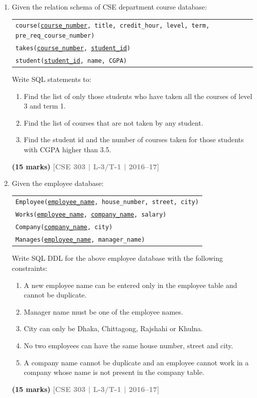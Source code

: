 \documentclass[12pt]{article}
\newcommand{\yr}[1]{\hfill\textcolor{gray}{\small\textbf{[#1]}}}
\newcommand{\mk}[1]{\textcolor{orange!70!black}{\small\textbf{(#1 marks)}}}
\begin{document}
\begin{enumerate}
\item Given the relation schema of CSE department course database:
\begin{center}
\begin{tabular}{l}
\texttt{course(\underline{course\_number}, title, credit\_hour, level, term, pre\_req\_course\_number)}\\
\texttt{takes(\underline{course\_number}, \underline{student\_id})}\\
\texttt{student(\underline{student\_id}, name, CGPA)}
\end{tabular}
\end{center}
Write SQL statements to:
\begin{enumerate}
  \item Find the list of only those students who have taken all the courses of level 3 and term 1.
  \item Find the list of courses that are not taken by any student.
  \item Find the student id and the number of courses taken for those students with CGPA higher than 3.5.
\end{enumerate}
\mk{15} \yr{CSE 303 | L-3/T-1 | 2016--17}


\item Given the employee database:
\begin{center}
\begin{tabular}{l}
\texttt{Employee(\underline{employee\_name}, house\_number, street, city)}\\
\texttt{Works(\underline{employee\_name}, \underline{company\_name}, salary)}\\
\texttt{Company(\underline{company\_name}, city)}\\
\texttt{Manages(\underline{employee\_name}, manager\_name)}
\end{tabular}
\end{center}
Write SQL DDL for the above employee database with the following constraints:
\begin{enumerate}
  \item A new employee name can be entered only in the employee table and cannot be duplicate.
  \item Manager name must be one of the employee names.
  \item City can only be Dhaka, Chittagong, Rajshahi or Khulna.
  \item No two employees can have the same house number, street and city.
  \item A company name cannot be duplicate and an employee cannot work in a company whose name is not present in the company table.
\end{enumerate}
\mk{15} \yr{CSE 303 | L-3/T-1 | 2016--17}



\end{enumerate}
\end{document}

